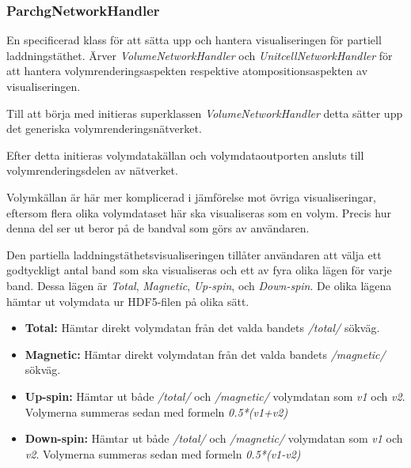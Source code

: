 \subsubsection{ParchgNetworkHandler}
En specificerad klass för att sätta upp och hantera visualiseringen för partiell laddningstäthet. Ärver \textit{VolumeNetworkHandler} och \textit{UnitcellNetworkHandler} för att hantera volymrenderingsaspekten respektive atompositionsaspekten av visualiseringen.



Till att börja med initieras superklassen \textit{VolumeNetworkHandler} detta sätter upp det generiska volymrenderingsnätverket. 

Efter detta initieras volymdatakällan och volymdataoutporten ansluts till volymrenderingsdelen av nätverket. 

Volymkällan är här mer komplicerad i jämförelse mot övriga visualiseringar, eftersom flera olika volymdataset här ska visualiseras som en volym. Precis hur denna del ser ut beror på de bandval som görs av användaren.


Den partiella laddningstäthetsvisualiseringen tillåter användaren att välja ett godtyckligt antal band som ska visualiseras och ett av fyra olika lägen för varje band. Dessa lägen är \textit{Total}, \textit{Magnetic}, \textit{Up-spin}, och \textit{Down-spin}. De olika lägena hämtar ut volymdata ur HDF5-filen på olika sätt.

\begin{itemize}
    \setlength\itemsep{0em}
    \item \textbf{Total: } Hämtar direkt volymdatan från det valda bandets \textit{/total/} sökväg.
    \item \textbf{Magnetic: } Hämtar direkt volymdatan från det valda bandets \textit{/magnetic/} sökväg.
    \item \textbf{Up-spin: } Hämtar ut både \textit{/total/} och \textit{/magnetic/} volymdatan som \textit{v1} och \textit{v2}. Volymerna summeras sedan med formeln \textit{0.5*(v1+v2)}
    \item \textbf{Down-spin: } Hämtar ut både \textit{/total/} och \textit{/magnetic/} volymdatan som \textit{v1} och \textit{v2}. Volymerna summeras sedan med formeln \textit{0.5*(v1-v2)}
\end{itemize}

